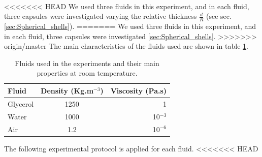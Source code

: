 \paragraph{}
<<<<<<< HEAD
We used three fluids in this experiment, and in each fluid, three capsules were investigated varying the relative thickness $\frac{d}{R}$ (see sec.\ref{sec:Spherical_shells}).
=======
We used three fluids in this experiment, and in each fluid, three capsules were investigated \ref{sec:Spherical_shells}.
>>>>>>> origin/master
The main characteristics of the fluids used are shown in table \ref{tab:fluid_carac_spring}. 
\begin{table}[H]
	\centering
		\begin{tabular}{|l|c|r|}
			\hline
			Fluid & Density (Kg.m$^{-3}$) & Viscosity (Pa.s)\\
			\hline
			Glycerol & 1250 & 1 \\
			\hline
			Water & 1000 & 10$^{-3} $\\
			\hline
			Air &  1.2 & 10$^{-6}$\\
			\hline
		\end{tabular}
	\caption{Fluids used in the experiments and their main properties at room temperature.}
	\label{tab:fluid_carac_spring}
\end{table}
The following experimental protocol is applied for each fluid.
<<<<<<< HEAD
